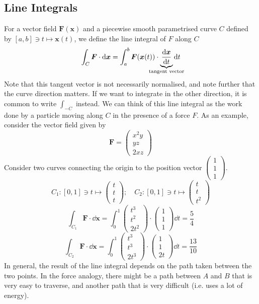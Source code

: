 \documentclass{article}
\begin{document}
\subsection{Line Integrals}
For a vector field $\bm F(\bm x)$ and a piecewise smooth parametrised curve $C$ defined by $[a, b] \ni t \mapsto \bm x(t)$, we define the line integral of $F$ along $C$
\[ \int_C \bm F \cdot \dd \bm x = \int_a^b \bm F(\bm x(t)) \cdot \underbrace{\frac{\dd \bm x}{\dd t}}_{\mathclap{\text{tangent vector}}} \dd t \]
Note that this tangent vector is not necessarily normalised, and note further that the curve direction matters. If we want to integrate in the other direction, it is common to write $\int_{-C}$ instead. We can think of this line integral as the work done by a particle moving along $C$ in the presence of a force $F$. As an example, consider the vector field given by
\[ \bm F = \begin{pmatrix}
        x^2 y \\ yz \\ 2xz
    \end{pmatrix} \]
Consider two curves connecting the origin to the position vector $\begin{pmatrix}
        1 \\ 1 \\ 1
    \end{pmatrix}$.
\[ C_1 \colon [0, 1] \ni t \mapsto \begin{pmatrix}
        t \\ t \\ t
    \end{pmatrix};\quad C_2 \colon [0, 1] \ni t \mapsto \begin{pmatrix}
        t \\ t \\ t^2
    \end{pmatrix} \]
\[ \int_{C_1}\bm F \cdot \dd \bm x = \int_0^1 \begin{pmatrix}
        t^3 \\ t^2 \\ 2t^2
    \end{pmatrix} \cdot \begin{pmatrix}
        1 \\ 1 \\ 1
    \end{pmatrix} \dd t = \frac{5}{4} \]
\[ \int_{C_2}\bm F \cdot \dd \bm x = \int_0^1 \begin{pmatrix}
        t^3 \\ t^3 \\ 2t^3
    \end{pmatrix} \cdot \begin{pmatrix}
        1 \\ 1 \\ 2t
    \end{pmatrix} \dd t = \frac{13}{10} \]
In general, the result of the line integral depends on the path taken between the two points. In the force analogy, there might be a path between $A$ and $B$ that is very easy to traverse, and another path that is very difficult (i.e. uses a lot of energy).
\end{document}
